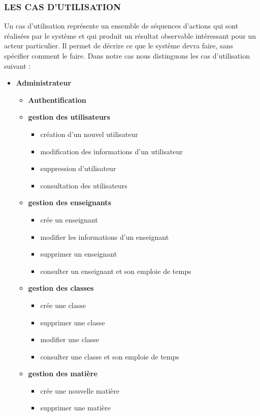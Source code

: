 \documentclass[english,12pt,a4paper]{report}
\begin{document}
\subsubsection{LES CAS D'UTILISATION}
Un cas d’utilisation représente un ensemble de séquences d’actions qui sont réalisées par le système et qui produit un résultat observable intéressant pour un acteur particulier. Il permet de décrire ce que le système devra faire, sans spécifier comment le faire. Dans notre cas nous distinguons les cas d’utilisation suivant :
\begin{itemize}
	\item \textbf{Administrateur}
	\begin{itemize}
		\item \textbf{Authentification}
		\item \textbf{gestion des utilisateurs}
		\begin{itemize}
			\item création d'un nouvel utilisateur
			\item modification des informations d'un utilisateur
			\item suppression d'utilisateur
			\item consultation des utilisateurs
		\end{itemize}
		\item \textbf{gestion des enseignants}
		\begin{itemize}
			\item crée un enseignant
			\item modifier les informations d'un enseignant
			\item supprimer un enseignant
			\item consulter un enseignant et son emploie de temps
		\end{itemize}
		\item \textbf{gestion des classes}
		\begin{itemize}
			\item crée une classe
			\item supprimer une classe
			\item modifier une classe
			\item consulter une classe et son emploie de temps
		\end{itemize}
		\item \textbf{gestion des matière}
		\begin{itemize}
			\item crée une nouvelle matière
			\item supprimer une matière

\end{itemize}
\end{itemize}
\end{itemize}
\end{document}
